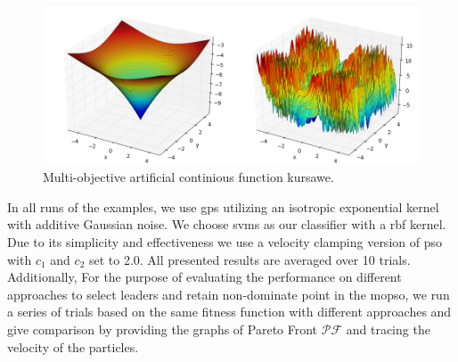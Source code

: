 \documentclass[12pt, runningheads,a4paper]{llncs}
\begin{document}
\begin{figure}
        \centering
    \centering
\includegraphics[width=1\textwidth]{./figs/kursawe_multi.png}
        \caption{Multi-objective artificial continious function kursawe.}\label{fig:fitexample1}
\end{figure}


In all runs of the examples, we use \acp{gp} utilizing an isotropic exponential kernel with additive Gaussian noise. We choose \acp{svm} as our classifier with a \ac{rbf} kernel. Due to its simplicity and effectiveness we use a velocity clamping version of \ac{pso} with $c_1$ and $c_2$ set to 2.0. All presented results are averaged over 10 trials.  Additionally, For the purpose of evaluating the performance on different approaches to select leaders and retain non-dominate point in the \ac{mopso}, we run a series of trials based on the same fitness function with different approaches and give comparison by providing the graphs of Pareto Front $\mathcal{PF}$ and tracing the velocity of the particles.
\end{document}
